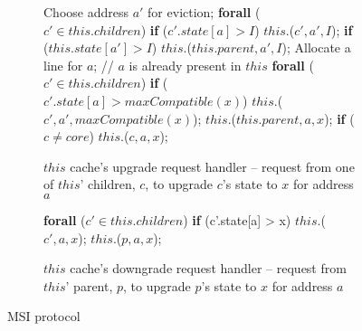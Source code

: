 \begin{figure}
\small

\begin{subfigure}{\linewidth}
\begin{boxedminipage}{\linewidth}
\begin{algorithmic}
        \State Choose address $a'$ for eviction;
        \State \textbf{forall} ($c' \in this.children$)
        \State \;\;\;\; \textbf{if} ($c'.state[a] > I$)
        \State \;\;\;\;\;\;\;\; \call{} $this.$\dReqL($c', a', I$);
        \State \textbf{if} ($this.state[a'] > I$)
        \State \;\;\;\; \call{} $this.$\dResp{}($this.parent, a', I$);
      \EndIf
      \State Allocate a line for $a$;
    \EndIf
    \State // $a$ is already present in $this$
    \State \textbf{forall} ($c' \in this.children$)
    \State \;\;\;\; \textbf{if} ($c'.state[a] > maxCompatible(x)$)
    \State \;\;\;\;\;\;\;\; \call{} $this.$\dReqL($c', a', maxCompatible(x)$);
    \State \call{} $this.$\uReqL{}($this.parent, a, x$);
  \State \textbf{if} ($c \neq core$)
  \State \;\;\;\; \call{} $this$.\uResp{}($c, a, x$);
\EndProc
\end{algorithmic}
\end{boxedminipage}
\caption{$this$ cache's upgrade request handler -- request from one of $this$' children, $c$, to upgrade $c$'s state to $x$ for address $a$ }
\label{atomicUReq1}
\end{subfigure}

\begin{subfigure}{\linewidth}
\begin{boxedminipage}{\linewidth}
\begin{algorithmic}
    \State \textbf{forall} ($c' \in this.children$)
    \State \;\;\;\; \textbf{if} (c'.state[a] > x)
    \State \;\;\;\;\;\;\;\; \call{} $this.$\dReqL($c', a, x$);
    \State \call{} $this.$\dResp($p, a, x$);
  \EndIf
\EndProc
\end{algorithmic}
\end{boxedminipage}
\caption{$this$ cache's downgrade request handler -- request from $this$'
parent, $p$, to upgrade $p$'s state to $x$ for address $a$ }
\label{atomicDReq1}
\end{subfigure}

\caption{MSI protocol}
\label{msi-template}
\end{figure}


